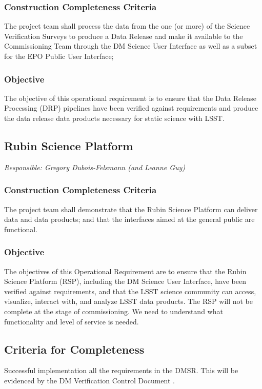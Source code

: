 \subsubsection{Construction Completeness Criteria}
The project team shall process the data from the one (or more) of the Science Verification Surveys to produce a Data Release and make it available to the Commissioning Team through the DM Science User Interface as well as a subset for the EPO Public User Interface;

\subsubsection{Objective}
The objective of this operational requirement is to ensure that the Data Release Processing (DRP) pipelines have been verified against requirements and produce the data release data products necessary for static science with LSST. 



\subsection{Rubin Science Platform}
{\it Responsible: Gregory Dubois-Felsmann (and Leanne Guy)}

\subsubsection{Construction Completeness Criteria}
The project team shall demonstrate that the Rubin Science Platform can deliver data and data products; and that the interfaces aimed at the general public are functional.

\subsubsection{Objective} 
The objectives of this Operational Requirement are to ensure that the Rubin Science Platform (RSP), including the DM Science User Interface, have been verified against requirements, and that the LSST science community can access, visualize, interact with, and analyze LSST data products. The RSP will not be complete at the stage of commissioning.  We need to understand what functionality and level of service is needed.
 
 

\subsection{Criteria for Completeness} 
Successful implementation all the requirements in the DMSR. 
This will be evidenced by the DM Verification Control Document .

